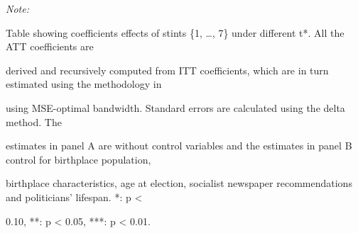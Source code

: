 \begin{table}[!h]
\begin{threeparttable}
\begin{tablenotes}[para]
\item \textit{Note: } 
\item Table showing coefficients effects of stints \{1, \dots, 7\} under different t*.  All the ATT coefficients are
\item derived and recursively computed from ITT coefficients, which are in turn estimated using the methodology in
\item \citep{cattaneo2019practical} using MSE-optimal bandwidth. Standard errors are calculated using the delta method. The
\item estimates in panel A are without control variables and the estimates in panel B control for birthplace population,
\item birthplace characteristics, age at election, socialist newspaper recommendations and politicians' lifespan. *: p <
\item 0.10, **: p < 0.05, ***: p < 0.01.
\end{tablenotes}
\end{threeparttable}
\end{table}
